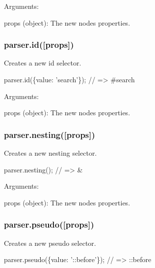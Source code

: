 Arguments\+:


\begin{DoxyItemize}
\item {\ttfamily props (object)}\+: The new node\textquotesingle{}s properties.
\end{DoxyItemize}

\subsubsection*{{\ttfamily parser.\+id(\mbox{[}props\mbox{]})}}

Creates a new id selector.


\begin{DoxyCode}
parser.id(\{value: 'search'\});
// => #search
\end{DoxyCode}


Arguments\+:


\begin{DoxyItemize}
\item {\ttfamily props (object)}\+: The new node\textquotesingle{}s properties.
\end{DoxyItemize}

\subsubsection*{{\ttfamily parser.\+nesting(\mbox{[}props\mbox{]})}}

Creates a new nesting selector.


\begin{DoxyCode}
parser.nesting();
// => &
\end{DoxyCode}


Arguments\+:


\begin{DoxyItemize}
\item {\ttfamily props (object)}\+: The new node\textquotesingle{}s properties.
\end{DoxyItemize}

\subsubsection*{{\ttfamily parser.\+pseudo(\mbox{[}props\mbox{]})}}

Creates a new pseudo selector.


\begin{DoxyCode}
parser.pseudo(\{value: '::before'\});
// => ::before
\end{DoxyCode}


